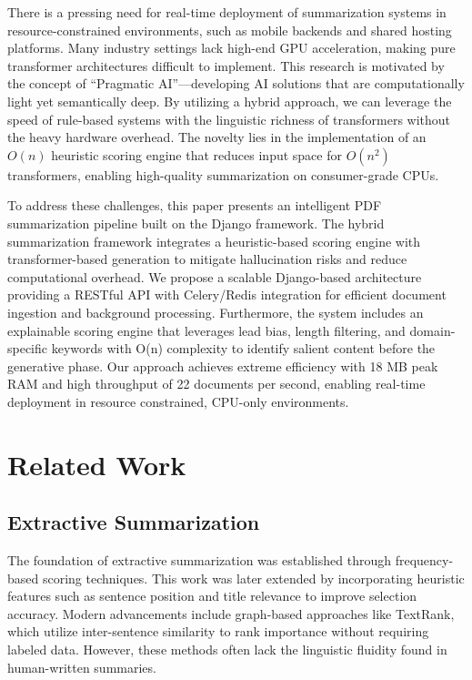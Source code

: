 \documentclass[conference]{IEEEtran}
\begin{document}
There is a pressing need for real-time deployment of summarization systems in resource-constrained environments, such as mobile backends and shared hosting platforms. Many industry settings lack high-end GPU acceleration, making pure transformer architectures difficult to implement. This research is motivated by the concept of ``Pragmatic AI''---developing AI solutions that are computationally light yet semantically deep. By utilizing a hybrid approach, we can leverage the speed of rule-based systems with the linguistic richness of transformers without the heavy hardware overhead. The novelty lies in the implementation of an \(O(n)\) heuristic scoring engine that reduces input space for \(O(n^2)\) transformers, enabling high-quality summarization on consumer-grade CPUs.

To address these challenges, this paper presents an intelligent PDF summarization pipeline built on the Django framework. The hybrid summarization framework integrates a heuristic-based scoring engine with transformer-based generation to mitigate hallucination risks and reduce computational overhead. We propose a scalable Django-based architecture providing a RESTful API with Celery/Redis integration for efficient document ingestion and background processing. Furthermore, the system includes an explainable scoring engine that leverages lead bias, length filtering, and domain-specific keywords with O(n) complexity to identify salient content before the generative phase. Our approach achieves extreme efficiency with 18 MB peak RAM and high throughput of 22 documents per second, enabling real-time deployment in resource constrained, CPU-only environments.

\section{Related Work}

\subsection{Extractive Summarization}

The foundation of extractive summarization was established through frequency-based scoring techniques. This work was later extended by incorporating heuristic features such as sentence position and title relevance to improve selection accuracy. Modern advancements include graph-based approaches like TextRank, which utilize inter-sentence similarity to rank importance without requiring labeled data. However, these methods often lack the linguistic fluidity found in human-written summaries.
\end{document}
